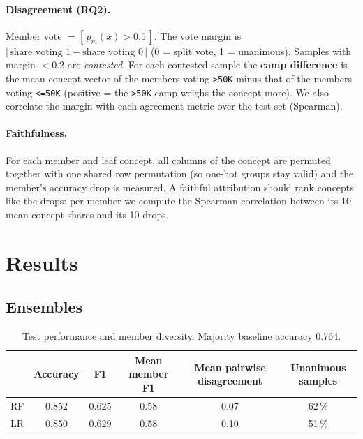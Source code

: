 \documentclass[11pt,a4paper]{article}
\begin{document}
\paragraph{Disagreement (RQ2).} Member vote $= [\,p_m(x) > 0.5\,]$. The vote margin is
$|\,\text{share voting 1} - \text{share voting 0}\,|$ (0 = split vote, 1 = unanimous). Samples with margin $< 0.2$
are \emph{contested}. For each contested sample the \textbf{camp difference} is the mean concept vector of the
members voting \texttt{>50K} minus that of the members voting \texttt{<=50K} (positive = the \texttt{>50K} camp
weighs the concept more). We also correlate the margin with each agreement metric over the test set (Spearman).

\paragraph{Faithfulness.} For each member and leaf concept, all columns of the concept are permuted together
with one shared row permutation (so one-hot groups stay valid) and the member's accuracy drop is measured. A
faithful attribution should rank concepts like the drops: per member we compute the Spearman correlation between
its 10 mean concept shares and its 10 drops.

\section{Results}\label{sec:results}

\subsection{Ensembles}

\begin{table}[h]
  \centering\small
  \caption{Test performance and member diversity. Majority baseline accuracy 0.764.}
  \label{tab:ens}
  \begin{tabular}{@{}lccccc@{}}
    \toprule
    & Accuracy & F1 & Mean member F1 & Mean pairwise disagreement & Unanimous samples \\
    \midrule
    RF & 0.852 & 0.625 & 0.58 & 0.07 & 62\,\% \\
    LR & 0.850 & 0.629 & 0.58 & 0.10 & 51\,\% \\
    \bottomrule
  \end{tabular}
\end{table}
\end{document}
